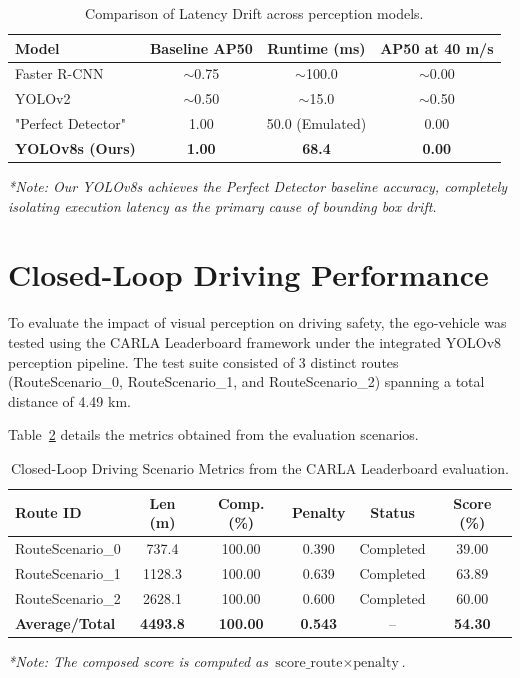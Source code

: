 \documentclass[11pt,a4paper]{report}
\begin{document}
\begin{table}[h!]
\centering
\begin{tabular}{lccc}
\toprule
\textbf{Model} & \textbf{Baseline AP50} & \textbf{Runtime (ms)} & \textbf{AP50 at 40 m/s} \\
\midrule
Faster R-CNN~\cite{erdos_pylot} & $\sim$0.75 & $\sim$100.0 & $\sim$0.00 \\
YOLOv2~\cite{erdos_pylot} & $\sim$0.50 & $\sim$15.0 & $\sim$0.50 \\
"Perfect Detector"~\cite{erdos_pylot} & 1.00 & 50.0 (Emulated) & 0.00 \\
\textbf{YOLOv8s (Ours)} & \textbf{1.00} & \textbf{68.4} & \textbf{0.00} \\
\bottomrule
\end{tabular}
\vspace{1ex}

{\small \textit{*Note: Our YOLOv8s achieves the Perfect Detector baseline accuracy, completely isolating execution latency as the primary cause of bounding box drift.}}
\caption{Comparison of Latency Drift across perception models.}
\label{tab:model_drift_comparison}
\end{table}

\section{Closed-Loop Driving Performance}
To evaluate the impact of visual perception on driving safety, the ego-vehicle was tested using the CARLA Leaderboard framework under the integrated YOLOv8 perception pipeline. The test suite consisted of 3 distinct routes (RouteScenario\_0, RouteScenario\_1, and RouteScenario\_2) spanning a total distance of 4.49 km. 

Table~\ref{tab:driving_metrics} details the metrics obtained from the evaluation scenarios.

\begin{table}[h!]
\centering
\begin{tabular}{lccccc}
\toprule
\textbf{Route ID} & \textbf{Len (m)} & \textbf{Comp. (\%)} & \textbf{Penalty} & \textbf{Status} & \textbf{Score (\%)} \\
\midrule
RouteScenario\_0  & 737.4  & 100.00 & 0.390 & Completed & 39.00 \\
RouteScenario\_1  & 1128.3 & 100.00 & 0.639 & Completed & 63.89 \\
RouteScenario\_2  & 2628.1 & 100.00 & 0.600 & Completed & 60.00 \\
\midrule
\textbf{Average/Total} & \textbf{4493.8} & \textbf{100.00} & \textbf{0.543} & -- & \textbf{54.30} \\
\bottomrule
\end{tabular}
\vspace{1ex}

{\small \textit{*Note: The composed score is computed as $\text{score\_route} \times \text{penalty}$.}}
\caption{Closed-Loop Driving Scenario Metrics from the CARLA Leaderboard evaluation.}
\label{tab:driving_metrics}
\end{table}
\end{document}

